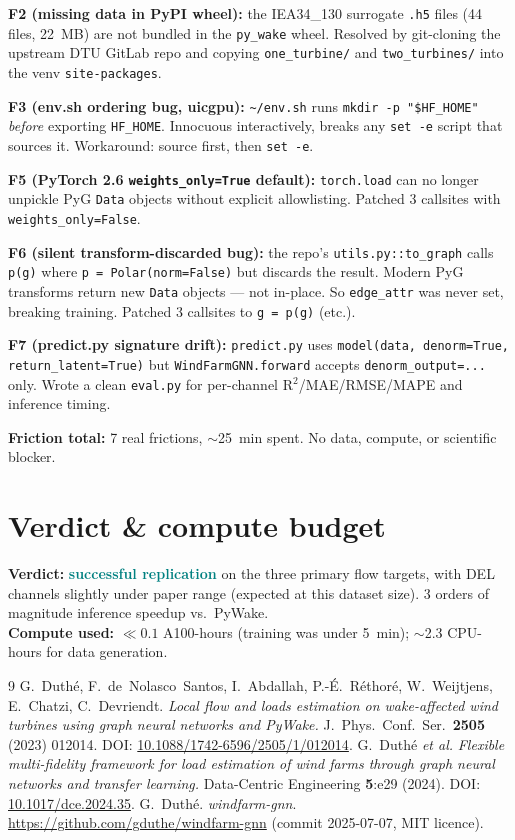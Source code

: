 \documentclass[10pt,letterpaper]{article}
\begin{document}
\textbf{F2 (missing data in PyPI wheel):} the IEA34\_130 surrogate \texttt{.h5} files (44 files, 22~MB) are not bundled in the \texttt{py\_wake} wheel. Resolved by git-cloning the upstream DTU GitLab repo and copying \texttt{one\_turbine/} and \texttt{two\_turbines/} into the venv \texttt{site-packages}.

\textbf{F3 (env.sh ordering bug, uicgpu):} \texttt{\textasciitilde/env.sh} runs \texttt{mkdir -p "\$HF\_HOME"} \emph{before} exporting \texttt{HF\_HOME}. Innocuous interactively, breaks any \texttt{set -e} script that sources it. Workaround: source first, then \texttt{set -e}.

\textbf{F5 (PyTorch 2.6 \texttt{weights\_only=True} default):} \texttt{torch.load} can no longer unpickle PyG \texttt{Data} objects without explicit allowlisting. Patched 3 callsites with \texttt{weights\_only=False}.

\textbf{F6 (silent transform-discarded bug):} the repo's \texttt{utils.py::to\_graph} calls \texttt{p(g)} where \texttt{p = Polar(norm=False)} but discards the result. Modern PyG transforms return new \texttt{Data} objects --- not in-place. So \texttt{edge\_attr} was never set, breaking training. Patched 3 callsites to \texttt{g = p(g)} (etc.).

\textbf{F7 (predict.py signature drift):} \texttt{predict.py} uses \texttt{model(data, denorm=True, return\_latent=True)} but \texttt{WindFarmGNN.forward} accepts \texttt{denorm\_output=...} only. Wrote a clean \texttt{eval.py} for per-channel R$^2$/MAE/RMSE/MAPE and inference timing.

\textbf{Friction total:} 7 real frictions, $\sim$25~min spent. No data, compute, or scientific blocker.

\section{Verdict \& compute budget}
\textbf{Verdict:} \textcolor{teal}{\textbf{successful replication}} on the three primary flow targets, with DEL channels slightly under paper range (expected at this dataset size). 3 orders of magnitude inference speedup vs.\ PyWake. \\
\textbf{Compute used:} $\ll 0.1$ A100-hours (training was under 5~min); $\sim$2.3 CPU-hours for data generation.

\begin{thebibliography}{9}
 G.~Duth\'e, F.\ de~Nolasco~Santos, I.~Abdallah, P.-\'E.~R\'ethor\'e, W.~Weijtjens, E.~Chatzi, C.~Devriendt. \emph{Local flow and loads estimation on wake-affected wind turbines using graph neural networks and PyWake.} J.\ Phys.\ Conf.\ Ser.\ \textbf{2505} (2023) 012014. DOI: \href{https://doi.org/10.1088/1742-6596/2505/1/012014}{10.1088/1742-6596/2505/1/012014}.
 G.~Duth\'e \emph{et al.} \emph{Flexible multi-fidelity framework for load estimation of wind farms through graph neural networks and transfer learning.} Data-Centric Engineering \textbf{5}:e29 (2024). DOI: \href{https://doi.org/10.1017/dce.2024.35}{10.1017/dce.2024.35}.
 G.~Duth\'e. \emph{windfarm-gnn}. \url{https://github.com/gduthe/windfarm-gnn} (commit 2025-07-07, MIT licence).
\end{thebibliography}
\end{document}
